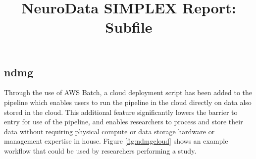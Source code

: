 \documentclass[simplex.tex]{subfiles}
\title{NeuroData SIMPLEX Report: Subfile}
\begin{document}


\subsection{ndmg}

Through the use of AWS Batch, a cloud deployment script has been added to the pipeline which enables users to run the
pipeline in the cloud directly on data also stored in the cloud. This additional feature significantly lowers the
barrier to entry for use of the pipeline, and enables researchers to process and store their data without requiring
physical compute or data storage hardware or management expertise in house. Figure \ref{fig:ndmgcloud} shows an example
workflow that could be used by researchers performing a study.
\end{document}

